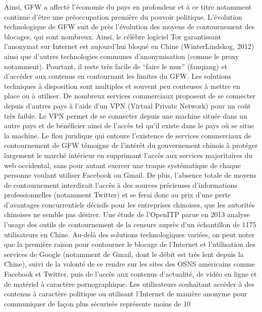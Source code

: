 Ainsi, GFW a affecté l’économie du pays en profondeur et à ce titre notamment continue d’être une préoccupation première du pouvoir politique. L’évolution technologique de GFW suit de près l’évolution des moyens de contournement des blocages, qui sont nombreux. Ainsi, le célèbre logiciel Tor garantissant l’anonymat sur Internet est aujourd’hui bloqué en Chine (WinterLindskog, 2012) ainsi que d’autres technologies communes d’anonymisation (comme le proxy notamment). Pourtant, il reste très facile de “faire le mur” (fanqiang) et d’accéder aux contenus en contournant les limites du GFW. Les solutions techniques à disposition sont multiples et souvent peu couteuses à mettre en place ou à utiliser. De nombreux services commerciaux proposent de se connecter depuis d’autres pays à l’aide d’un VPN (Virtual Private Network) pour un coût très faible. Le VPN permet de se connecter depuis une machine située dans un autre pays et de bénéficier ainsi de l’accès tel qu’il existe dans le pays où se situe la machine. Le flou juridique qui entoure l’existence de services commerciaux de contournement de GFW témoigne de l’intérêt du gouvernement chinois à protéger largement le marché intérieur en supprimant l’accès aux services majoritaires du web occidental, sans pour autant exercer une traque systématique de chaque personne voulant utiliser Facebook ou Gmail. De plus, l’absence totale de moyens de contournement interdirait l’accès à des sources précieuses d’informations professionnelles (notamment Twitter) et se ferai donc au prix d’une perte d’avantages concurrentiels décisifs pour les entreprises chinoises, que les autorités chinoises ne semble pas désirer. Une étude de l’OpenITP parue en 2013 analyse l’usage des outils de contournement de la censure auprès d’un échantillon de 1175 utilisateurs en Chine. Au-delà des solutions technologiques variées, on peut noter que la première raison pour contourner le blocage de l’Internet et l’utilisation des services de Google (notamment de Gmail, dont le débit est très lent depuis la Chine), suivi de la volonté de ce rendre sur les sites des OSNS américains comme Facebook et Twitter, puis de l’accès aux contenus d’actualité, de vidéo en ligne et de matériel à caractère pornographique. Les utilisateurs souhaitant accéder à des contenus à caractère politique ou utilisant l’Internet de manière anonyme pour communiquer de façon plus sécurisée représente moins de 10%

